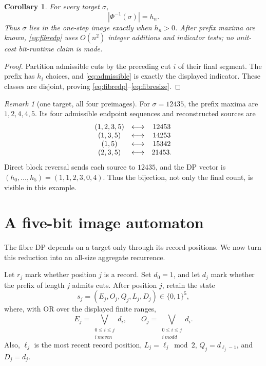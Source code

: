 \documentclass[10pt,a4paper]{amsart}
\newtheorem{corollary}[theorem]{Corollary}
\theoremstyle{definition}
\theoremstyle{remark}
\newtheorem{remark}[theorem]{Remark}
\begin{document}
\begin{corollary}\label{cor:dp}
For every target \(\sigma\),
\[
                         |\Phi^{-1}(\sigma)|=h_n.           \tag{3.4}\label{eq:fibresize}
\]
Thus \(\sigma\) lies in the one-step image exactly when \(h_n>0\).
After prefix maxima are known, \eqref{eq:fibredp} uses \(O(n^2)\) integer
additions and indicator tests; no unit-cost bit-runtime claim is made.
\end{corollary}

\begin{proof}
Partition admissible cuts by the preceding cut \(i\) of their final segment.
The prefix has \(h_i\) choices, and \eqref{eq:admissible} is exactly the displayed
indicator.  These classes are disjoint, proving \eqref{eq:fibredp}--\eqref{eq:fibresize}.
\end{proof}

\begin{remark}[one target, all four preimages]\label{rem:example}
For \(\sigma=12435\), the prefix maxima are \(1,2,4,4,5\).  Its four
admissible endpoint sequences and reconstructed sources are
\[
\begin{array}{c@{\quad\longleftrightarrow\quad}c}
(1,2,3,5)&12453\\
(1,3,5)&14253\\
(1,5)&15342\\
(2,3,5)&21453.
\end{array}
\]
Direct block reversal sends each source to \(12435\), and the DP vector is
\((h_0,\ldots,h_5)=(1,1,2,3,0,4)\).  Thus the bijection, not only the final
count, is visible in this example.
\end{remark}

\section{A five-bit image automaton}

The fibre DP depends on a target only through its record positions.  We now
turn this reduction into an all-size aggregate recurrence.

Let \(r_j\) mark whether position \(j\) is a record.  Set \(d_0=1\), and let
\(d_j\) mark whether the prefix of length \(j\) admits cuts.  After position
\(j\), retain the state
\[
                         s_j=(E_j,O_j,Q_j,L_j,D_j)\in\{0,1\}^5, \tag{4.1}
\]
where, with OR over the displayed finite ranges,
\[
 E_j=\bigvee_{\substack{0\le i\le j\\i\ {
m even}}}d_i,
 \qquad
 O_j=\bigvee_{\substack{0\le i\le j\\i\ {
m odd}}}d_i.
\]
Also, \(\ell_j\) is the most recent record position,
\(L_j=\ell_j\bmod2\), \(Q_j=d_{\ell_j-1}\), and \(D_j=d_j\).
\end{document}
